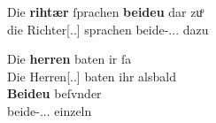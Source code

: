 \begin{exe}
\ex \label{ex:richtherriu2}
	\begin{xlist}
	\ex \label{ex:richtherriu2_1}
		\gll Die \textbf{rihtær} ſprachen \textbf{beideu} {dar zuͦ} \\
			die Richter[\Nom.\Pl.\MascM] sprachen beide-\Nom.\Pl.\NeutM.\St{}
			dazu \\
		\begin{taggedline}{\parencites[\pno~28\ra, 8]{kc:B1}[vgl.~abweichend][10090]{schroeder1895}} %
		\trans {}
		\end{taggedline}

	\ex \label{ex:richtherriu2_2}
		\gll Die \textbf{herren} baten ir ſa \\
			Die Herren[\Nom.\Pl.\MascM] baten ihr alsbald \\
	\sn \gll \textbf{Beideu} beſvnder \\
			beide-\Nom.\Pl.\NeutM.\St{} einzeln \\
		\begin{taggedline}{\parencites[\pno~31\va, 48--49]{kc:B1}[vgl.][11385--11386]{schroeder1895}} %
		\trans {}
		\end{taggedline}
	\end{xlist}
\end{exe}



